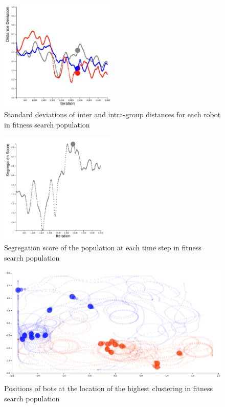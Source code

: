 \begin{figure}
    \centering
    \includegraphics[width=5.5cm]{imgs/final_dev_2.png}
    \caption{Standard deviations of inter and intra-group distances for each robot in fitness search population}
    \label{fig:final_dev_2}
\end{figure}

\begin{figure}
    \centering
    \includegraphics[width=5.5cm]{imgs/final_seg_2.png}
    \caption{Segregation score of the population at each time step in fitness search population}
    \label{fig:final_seg_2}
\end{figure}

\begin{figure}
    \centering
    \includegraphics[width=\linewidth]{imgs/final_place_2.png}
    \caption{Positions of bots at the location of the highest clustering in fitness search population}
    \label{fig:final_pos_2}
\end{figure}


